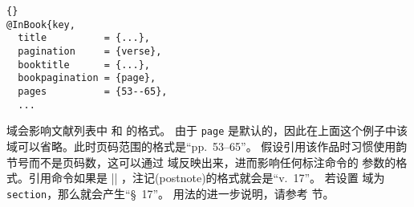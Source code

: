 \begin{lstlisting}[style=bibtex]{}
@InBook{key,
  title          = {...},
  pagination     = {verse},
  booktitle      = {...},
  bookpagination = {page},
  pages          = {53--65},
  ...
\end{lstlisting}
%
 域会影响文献列表中   和  的格式。
由于 \texttt{page} 是默认的，因此在上面这个例子中该域可以省略。此时页码范围的格式是“pp.~53--65”。
假设引用该作品时习惯使用韵节号而不是页码数，这可以通过  域反映出来，进而影响任何标注命令的  参数的格式。引用命令如果是 |\cite[17]{key}| ，注记(postnote)的格式就会是“v.~17”。
若设置  域为 \texttt{section}，那么就会产生“\S~17”。
用法的进一步说明，请参考  节。

